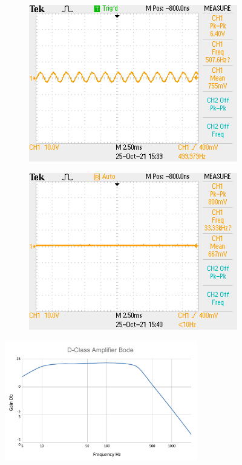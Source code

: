 \documentclass[11pt]{article}
\begin{document}
{\begin{figure}[h!]
\begin{subfigure}{0.3\textwidth}
      \includegraphics[width=\columnwidth]{img/testing/power_output/filter_output_500Hz.JPG}
      \subcaption{}
  \end{subfigure}
  \begin{subfigure}{0.3\textwidth}
      \includegraphics[width=\columnwidth]{img/testing/power_output/filter_output_2kHz.JPG}
      \subcaption{}
  \end{subfigure}
  \caption{}
\end{figure}

\begin{figure}[h!]
  \centering
  \includegraphics[width=0.75\textwidth]{img/testing/amplifier_bode.pdf}
  \caption{}
\end{figure}

}
\end{document}
